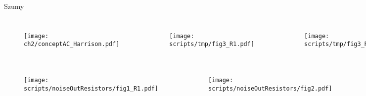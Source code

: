 \begin{frame}{Szumy}
    \vspace{-5mm} %

    \begin{columns}
    \begin{figure}[H]
        \centering
        \texttt{[image: ch2/conceptAC\_Harrison.pdf]} 
    \end{figure}
        \begin{figure}[H]
            \centering
            \texttt{[image: scripts/tmp/fig3\_R1.pdf]}
        \end{figure}
        \begin{figure}[H]
            \centering
            \texttt{[image: scripts/tmp/fig3\_R2.pdf]}
        \end{figure}
    \end{columns}

    \vspace{-5mm} %


    \begin{columns}
        \begin{figure}[H]
            \centering
            \texttt{[image: scripts/noiseOutResistors/fig1\_R1.pdf]}
        \end{figure}
        \begin{figure}[H]
            \centering
            \texttt{[image: scripts/noiseOutResistors/fig2.pdf]}
        \end{figure}
    \end{columns}


\end{frame}


